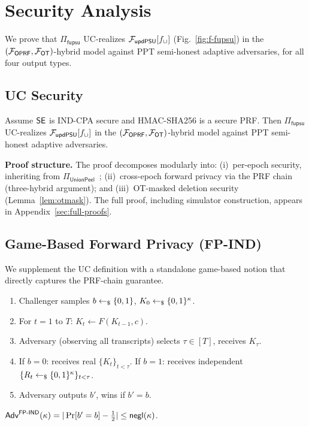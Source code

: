 \section{Security Analysis}
\label{sec:security}

We prove that $\Pi_{\mathsf{fupsu}}$ UC-realizes $\mathcal{F}_{\mathsf{updPSU}}[f_{\cup}]$
(Fig.~\ref{fig:f-fupsu}) in the $(\mathcal{F}_{\mathsf{OPRF}}, \mathcal{F}_{\mathsf{OT}})$-hybrid
model against PPT semi-honest adaptive adversaries, for all four output types.

\subsection{UC Security}

\begin{theorem}\label{thm:main}
Assume $\mathsf{SE}$ is IND-CPA secure and HMAC-SHA256 is a secure PRF. Then
$\Pi_{\mathsf{fupsu}}$ UC-realizes $\mathcal{F}_{\mathsf{updPSU}}[f_{\cup}]$ in the
$(\mathcal{F}_{\mathsf{OPRF}}, \mathcal{F}_{\mathsf{OT}})$-hybrid model against PPT semi-honest
adaptive adversaries.
\end{theorem}

\textbf{Proof structure.} The proof decomposes modularly into: (i)~per-epoch
security, inheriting from $\Pi_{\mathsf{UnionPeel}}$~\cite{PT26};
(ii)~cross-epoch forward privacy via the PRF chain (three-hybrid argument);
and (iii)~OT-masked deletion security (Lemma~\ref{lem:otmask}). The full
proof, including simulator construction, appears in
Appendix~\ref{sec:full-proofs}.

\subsection{Game-Based Forward Privacy (FP-IND)}

We supplement the UC definition with a standalone game-based notion that
directly captures the PRF-chain guarantee.

\begin{definition}\label{def:fp-ind}
\begin{enumerate}
\item Challenger samples $b \leftarrow_{\$} \{0,1\}$, $K_0 \leftarrow_{\$} \{0,1\}^\kappa$.
\item For $t = 1$ to $T$: $K_t \leftarrow F(K_{t-1}, c)$.
\item Adversary (observing all transcripts) selects $\tau \in [T]$, receives
$K_\tau$.
\item If $b = 0$: receives real $\{K_t\}_{t < \tau}$. If $b = 1$: receives
independent $\{R_t \leftarrow_{\$} \{0,1\}^\kappa\}_{t < \tau}$.
\item Adversary outputs $b'$, wins if $b' = b$.
\end{enumerate}
$\mathsf{Adv}^{\mathsf{FP\text{-}IND}}(\kappa) = |\Pr[b' = b] - \tfrac{1}{2}|
\leq \mathsf{negl}(\kappa)$.
\end{definition}

